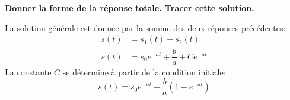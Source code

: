 \question{}                                                                                                                               
\textbf{Donner la forme de la réponse totale. Tracer cette solution.}                                                                     
                                                                                                                                          
La solution générale est donnée par la somme des deux réponses précédentes:                                                               
\begin{align*}                                                                                                                            
    s(t)&=s_1(t)+s_2(t)\\                                                                                                                 
    s(t)&=s_0e^{-at}+\dfrac{b}{a}+Ce^{-at}                                                                                                
\end{align*}                                                                                                                              
La constante $C$ se détermine à partir de la condition initiale:                                                                          
$$                                                                                                                                        
s(t)=s_0e^{-at}+\dfrac{b}{a}\left(1-e^{-at}\right)                                                                                        
$$                                                                                                                                        
